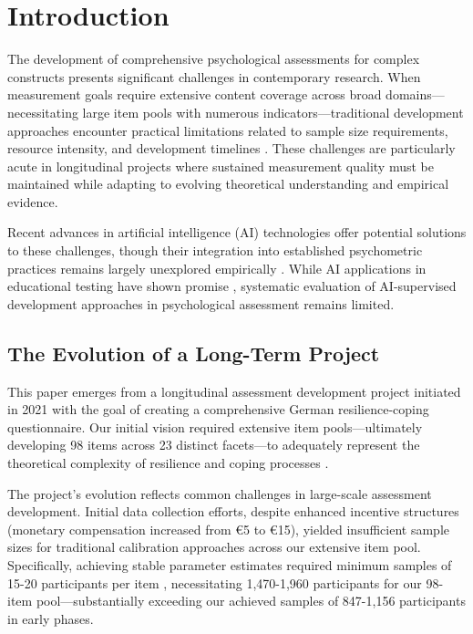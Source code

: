 \documentclass[12pt,a4paper]{article}
\begin{document}
\newpage

\section{Introduction}

The development of comprehensive psychological assessments for complex constructs presents significant challenges in contemporary research. When measurement goals require extensive content coverage across broad domains—necessitating large item pools with numerous indicators—traditional development approaches encounter practical limitations related to sample size requirements, resource intensity, and development timelines \cite{Embretson2013, VanderLinden2016}. These challenges are particularly acute in longitudinal projects where sustained measurement quality must be maintained while adapting to evolving theoretical understanding and empirical evidence.

Recent advances in artificial intelligence (AI) technologies offer potential solutions to these challenges, though their integration into established psychometric practices remains largely unexplored empirically \cite{Zumbo2019, Drasgow2023}. While AI applications in educational testing have shown promise \cite{Yan2020, Chen2021}, systematic evaluation of AI-supervised development approaches in psychological assessment remains limited.

\subsection{The Evolution of a Long-Term Project}

This paper emerges from a longitudinal assessment development project initiated in 2021 with the goal of creating a comprehensive German resilience-coping questionnaire. Our initial vision required extensive item pools—ultimately developing 98 items across 23 distinct facets—to adequately represent the theoretical complexity of resilience and coping processes \cite{Bonanno2004, Southwick2014}.

The project's evolution reflects common challenges in large-scale assessment development. Initial data collection efforts, despite enhanced incentive structures (monetary compensation increased from €5 to €15), yielded insufficient sample sizes for traditional calibration approaches across our extensive item pool. Specifically, achieving stable parameter estimates required minimum samples of 15-20 participants per item \cite{DeAyala2009}, necessitating 1,470-1,960 participants for our 98-item pool—substantially exceeding our achieved samples of 847-1,156 participants in early phases.
\end{document}
